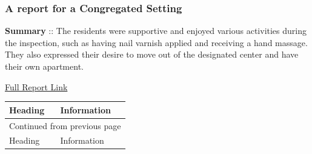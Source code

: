 \documentclass[a4paper,11pt,twoside]{article}
\begin{document}
\subsubsection{A report for a Congregated Setting}
\label{sec:org7820872}

\textbf{Summary} :: The residents were supportive and enjoyed various activities during the inspection, such as having nail varnish applied and receiving a hand massage. They also expressed their desire to move out of the designated center and have their own apartment.

\href{https://www.hiqa.ie/system/files?file=inspectionreports/4745-lios-mor-16-september-2020.pdf}{Full Report Link}

\begin{longtable}{p{11cm}|p{5cm}}
Heading & Information\\[0pt]
\hline
\endfirsthead
\multicolumn{2}{l}{Continued from previous page} \\[0pt]
\hline

Heading & Information \\[0pt]


\end{longtable}
\end{document}
